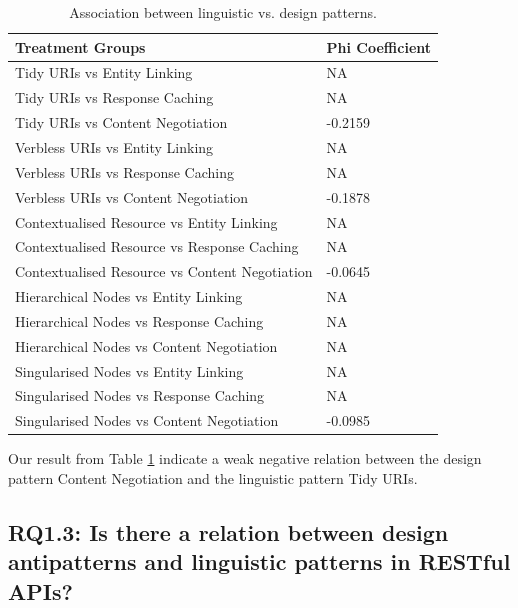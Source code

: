 \begin{table}[ht!]
    \centering
    \small
  \begin{tabular}{|l|l|}
\hline \textbf{Treatment Groups} & \textbf{Phi Coefficient} 
\\ \hline 
Tidy URIs vs Entity Linking & NA
\\ \hline
Tidy URIs vs Response Caching & NA
\\ \hline
Tidy URIs vs Content Negotiation & -0.2159
\\ \hline
Verbless URIs vs Entity Linking & NA
\\ \hline
Verbless URIs vs Response Caching & NA
\\ \hline
Verbless URIs vs Content Negotiation & -0.1878
\\ \hline
Contextualised Resource vs Entity Linking & NA
\\ \hline
Contextualised Resource vs Response Caching & NA
\\ \hline
Contextualised Resource vs Content Negotiation & -0.0645
\\ \hline
Hierarchical Nodes vs Entity Linking & NA
\\ \hline
Hierarchical Nodes vs Response Caching & NA
\\ \hline
Hierarchical Nodes vs Content Negotiation & NA
\\ \hline
Singularised Nodes vs Entity Linking & NA
\\ \hline
Singularised Nodes vs Response Caching & NA
\\ \hline
Singularised Nodes vs Content Negotiation & -0.0985
\\ \hline
  \end{tabular}
    \caption{Association between linguistic vs. design patterns.}
    \label{tab:Linguisticvsdesignpatterns}
\end{table}


Our result from Table \ref{tab:Linguisticvsdesignpatterns} indicate a weak negative relation between the design pattern Content Negotiation and the linguistic pattern Tidy URIs. 

\subsection{RQ1.3: Is there a relation between design antipatterns and linguistic patterns in RESTful APIs?}

